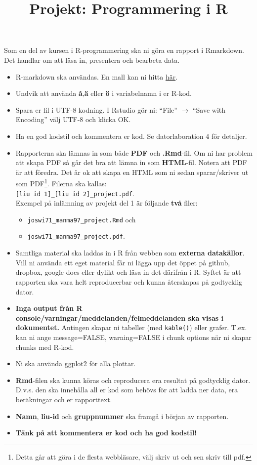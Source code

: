 \documentclass[swedish,english]{article}\usepackage[]{graphicx}\usepackage[]{xcolor}
\begin{document}
\title{Projekt: Programmering i R}

\maketitle
Som en del av kursen i R-programmering ska ni göra en rapport i Rmarkdown.
Det handlar om att läsa in, presentera och bearbeta data.
\begin{itemize}
\item R-markdown ska användas. En mall kan ni hitta \textcolor{blue}{\href{https://raw.githubusercontent.com/STIMALiU/KursRprgm2/main/Labs/Project/TemplateProjekt.Rmd}{här}}.
\item Undvik att använda \textbf{å},\textbf{ä} eller \textbf{ö} i variabelnamn
i er R-kod.
\item Spara er fil i UTF-8 kodning. I Rstudio gör ni: “File” $\rightarrow$
“Save with Encoding” välj UTF-8 och klicka OK.
\item Ha en god kodstil och kommentera er kod. Se datorlaboration 4 för
detaljer. 
\item Rapporterna ska lämnas in som både \textbf{PDF} och \textbf{.Rmd}-fil.
Om ni har problem att skapa PDF så går det bra att lämna in som \textbf{HTML}-fil.
Notera att PDF är att föredra. Det är ok att skapa en HTML som ni
sedan sparar/skriver ut som PDF\footnote{Detta går att göra i de flesta webbläsare, välj skriv ut och sen skriv
till pdf.}. Filerna ska kallas: \texttt{}~\\
\texttt{{[}liu id 1{]}\_{[}liu id 2{]}\_project.pdf}. \\
Exempel på inlämning av projekt del 1 är följande \textbf{två} filer: 
\begin{itemize}
\item \texttt{joswi71\_manma97\_project.Rmd} och
\item \texttt{joswi71\_manma97\_project.pdf}. 
\end{itemize}
\item Samtliga material ska laddas in i R från webben som \textbf{externa
datakällor}. Vill ni använda ett eget material får ni lägga upp det
öppet på github, dropbox, google docs eller dylikt och läsa in det
därifrån i R. Syftet är att rapporten ska vara helt reproducerbar
och kunna återskapas på godtycklig dator.
\item \textbf{Inga output från R console/varningar/meddelanden/felmeddelanden
ska visas i dokumentet.} Antingen skapar ni tabeller (med \texttt{kable()})
eller grafer. T.ex. kan ni ange message=FALSE, warning=FALSE i chunk
options när ni skapar chunks med R-kod.
\item Ni ska använda ggplot2 för alla plottar.
\item \textbf{Rmd}-filen ska kunna köras och reproducera era resultat på
godtycklig dator. D.v.s. den ska innehålla all er kod som behövs för
att ladda ner data, era beräkningar och er rapporttext. 
\item \textbf{Namn}, \textbf{liu-id} och \textbf{gruppnummer} ska framgå
i början av rapporten.
\item \textbf{Tänk på att kommentera er kod och ha god kodstil!}
\end{itemize}
\end{document}

